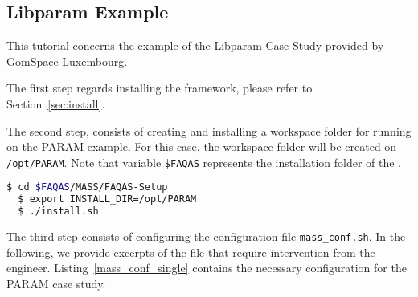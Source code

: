 
\subsection{Libparam Example}
\label{sec:single_machine_libparam}

This tutorial concerns the example of the Libparam Case Study provided by GomSpace Luxembourg.

The first step regards installing the \MASS framework, please refer to Section~\ref{sec:install}.

The second step, consists of creating and installing a workspace folder for running \MASS on the PARAM example. For this case, the workspace folder will be created on \texttt{/opt/PARAM}. Note that variable \texttt{\$FAQAS} represents the installation folder of the \FAQAS.

\begin{lstlisting}[language=bash]
  $ cd $FAQAS/MASS/FAQAS-Setup
  $ export INSTALL_DIR=/opt/PARAM
  $ ./install.sh
\end{lstlisting}

The third step consists of configuring the \MASS configuration file \texttt{mass\_conf.sh}. In the following, we provide excerpts of the file that require intervention from the engineer. Listing~\ref{mass_conf_single} contains the necessary configuration for the PARAM case study.

